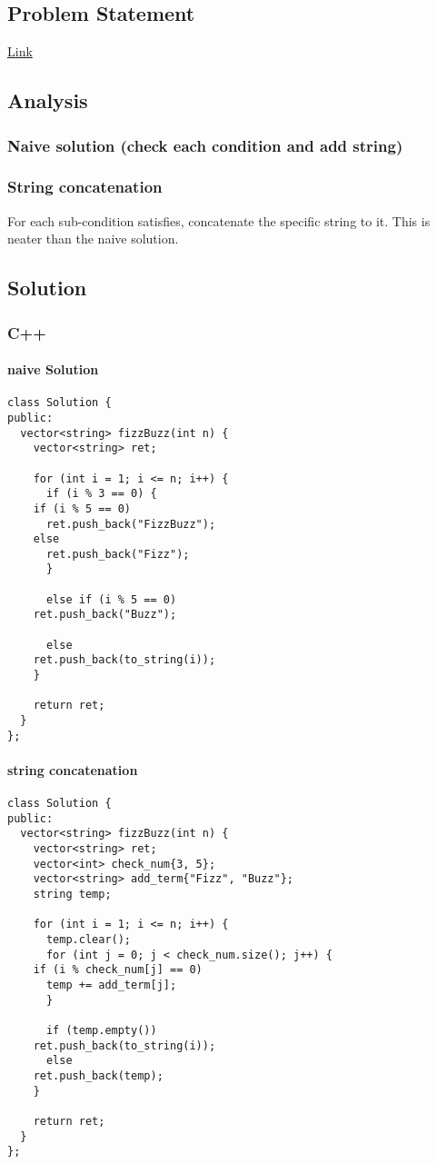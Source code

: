 \documentclass[12pt]{article}
\begin{document}
\subsection{Problem Statement}
\label{sec:org37d8d64}
\href{https://leetcode.com/problems/fizz-buzz/}{Link}
\subsection{Analysis}
\label{sec:org45e5460}
\subsubsection{Naive solution (check each condition and add string)}
\label{sec:org2521756}
\subsubsection{String concatenation}
\label{sec:org9a23466}
For each sub-condition satisfies, concatenate the specific string to it. This is neater than the naive solution.
\subsection{Solution}
\label{sec:orgec7b042}
\subsubsection{C++}
\label{sec:org4b5dd14}
\paragraph{naive Solution}
\label{sec:orgbf81e17}
\begin{verbatim}
class Solution {
public:
  vector<string> fizzBuzz(int n) {
    vector<string> ret;

    for (int i = 1; i <= n; i++) {
      if (i % 3 == 0) {
	if (i % 5 == 0)
	  ret.push_back("FizzBuzz");
	else
	  ret.push_back("Fizz");
      }

      else if (i % 5 == 0)
	ret.push_back("Buzz");

      else
	ret.push_back(to_string(i));
    }

    return ret;
  }
};
\end{verbatim}
\paragraph{string concatenation}
\label{sec:org87d18a5}
\begin{verbatim}
class Solution {
public:
  vector<string> fizzBuzz(int n) {
    vector<string> ret;
    vector<int> check_num{3, 5};
    vector<string> add_term{"Fizz", "Buzz"};
    string temp;

    for (int i = 1; i <= n; i++) {
      temp.clear();
      for (int j = 0; j < check_num.size(); j++) {
	if (i % check_num[j] == 0)
	  temp += add_term[j];
      }

      if (temp.empty())
	ret.push_back(to_string(i));
      else
	ret.push_back(temp);
    }

    return ret;
  }
};
\end{verbatim}
\end{document}
